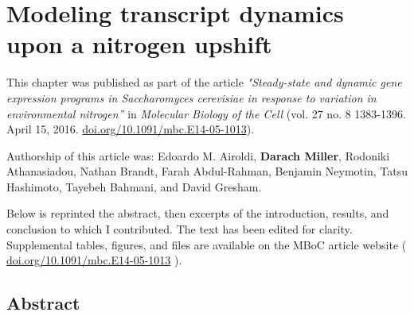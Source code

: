 \chapter{Modeling transcript dynamics upon a nitrogen upshift}
\label{chapter:two} 

This chapter was published as part of the article 
\textit{"Steady-state and dynamic gene expression programs in 
Saccharomyces cerevisiae in response to variation in 
environmental nitrogen”} in \textit{Molecular Biology of the Cell}
(vol. 27 no. 8 1383-1396. April 15, 2016.
\url{doi.org/10.1091/mbc.E14-05-1013}).

Authorship of this article was: Edoardo M. Airoldi, 
\textbf{Darach Miller},
Rodoniki Athanasiadou, Nathan Brandt, Farah Abdul-Rahman, Benjamin
Neymotin, Tatsu Hashimoto, Tayebeh Bahmani, and David Gresham. 

Below is reprinted the abstract, then excerpts of the introduction,
results, and conclusion to which I contributed. 
The text has been edited for clarity. Supplemental tables,
figures, and files are available on the MBoC article website (
\url{doi.org/10.1091/mbc.E14-05-1013} ).  

\section{Abstract} 

